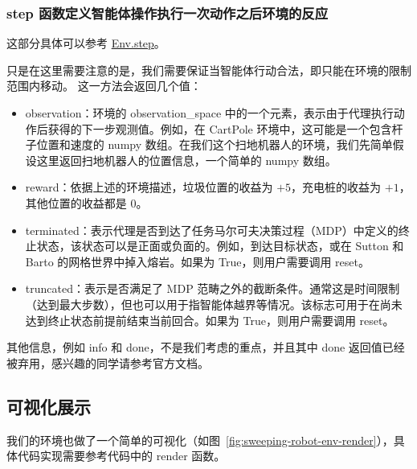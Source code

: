 \documentclass[citestyle=gb7714-2015, bibstyle=gb7714-2015,lang=cn,14pt,scheme=chinese]{elegantbook}
\begin{document}
\subsubsection{\textsf{step} 函数定义智能体操作执行一次动作之后环境的反应}

这部分具体可以参考 \href{https://gymnasium.farama.org/api/env/#gymnasium.Env.step}{\textsf{Env.step}}。

只是在这里需要注意的是，我们需要保证当智能体行动合法，即只能在环境的限制范围内移动。
这一方法会返回几个值：
\begin{itemize}
    \item observation：环境的 observation\_space 中的一个元素，表示由于代理执行动作后获得的下一步观测值。例如，在 CartPole 环境中，这可能是一个包含杆子位置和速度的 numpy 数组。在我们这个扫地机器人的环境，我们先简单假设这里返回扫地机器人的位置信息，一个简单的 numpy 数组。
    \item reward：依据上述的环境描述，垃圾位置的收益为 \(+5\)，充电桩的收益为 \(+1\)，其他位置的收益都是 \(0\)。
    \item terminated：表示代理是否到达了任务马尔可夫决策过程（MDP）中定义的终止状态，该状态可以是正面或负面的。例如，到达目标状态，或在 Sutton 和 Barto 的网格世界中掉入熔岩。如果为 True，则用户需要调用 \textsf{reset}。
    \item truncated：表示是否满足了 MDP 范畴之外的截断条件。通常这是时间限制（达到最大步数），但也可以用于指智能体越界等情况。该标志可用于在尚未达到终止状态前提前结束当前回合。如果为 True，则用户需要调用 \textsf{reset}。
\end{itemize}
其他信息，例如 info 和 done，不是我们考虑的重点，并且其中 done 返回值已经被弃用，感兴趣的同学请参考官方文档。

\subsection{可视化展示}

我们的环境也做了一个简单的可视化（如图~\ref{fig:sweeping-robot-env-render}），具体代码实现需要参考代码中的 \textsf{render} 函数。
\end{document}

